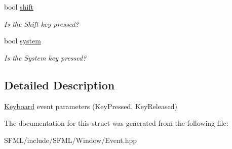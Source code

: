 \begin{DoxyCompactItemize}
\mbox{\label{structsf_1_1_event_1_1_key_event_a776af1a3ca79abeeec18ebf1c0065aa9}} 
bool \mbox{\hyperlink{structsf_1_1_event_1_1_key_event_a776af1a3ca79abeeec18ebf1c0065aa9}{shift}}
\begin{DoxyCompactList}\small\item\em Is the Shift key pressed? \end{DoxyCompactList}\item 
\mbox{\label{structsf_1_1_event_1_1_key_event_ac0557f7edc2a608ec65175fdd843afc5}} 
bool \mbox{\hyperlink{structsf_1_1_event_1_1_key_event_ac0557f7edc2a608ec65175fdd843afc5}{system}}
\begin{DoxyCompactList}\small\item\em Is the System key pressed? \end{DoxyCompactList}\end{DoxyCompactItemize}


\subsection{Detailed Description}
\mbox{\hyperlink{classsf_1_1_keyboard}{Keyboard}} event parameters (Key\+Pressed, Key\+Released) 

\begin{DoxyVerb}\end{DoxyVerb}
 

The documentation for this struct was generated from the following file\+:\begin{DoxyCompactItemize}
\item 
S\+F\+M\+L/include/\+S\+F\+M\+L/\+Window/Event.\+hpp\end{DoxyCompactItemize}
